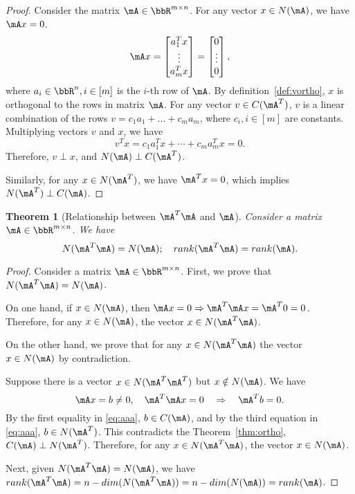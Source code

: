 \documentclass[11pt]{article}
\theoremstyle{plain}
\newtheorem{thm}{Theorem}[section]
\theoremstyle{definition}
\begin{document}
\begin{proof}
	Consider the matrix $\mA \in \bbR^{m \times n}$. For any vector $x \in N(\mA)$, we have $\mA x = 0$. 
	\begin{align}
		\mA x  = \begin{bmatrix}
			a_1^T x \\ \vdots \\ a_m^T x 
		\end{bmatrix} = \begin{bmatrix}
			0\\ \vdots \\0
		\end{bmatrix},
	\end{align}
	where $a_i \in \bbR^n, i \in [m]$ is the $i$-th  row of $\mA$. By definition~\ref{def:vortho}, $x$ is orthogonal to the rows in matrix $\mA$. For any vector $v \in C(\mA^T)$, $v$ is a linear combination of the rows $v = c_1 a_1 + ...+c_m a_m$, where $c_i, i\in [m]$ are constants. Multiplying vectors $v$ and $x$, we have
	\[  v^T x =  c_1 a_1^T x + \cdots + c_m a_m^T x = 0.  \]
	Therefore, $v \perp x$, and $N(\mA) \perp C(\mA^T)$.
	
	Similarly, for any $x \in N(\mA^T)$, we have $\mA^T x = 0$, which implies $N(\mA^T) \perp C(\mA)$. 
\end{proof}

\begin{thm}[Relationship between $\mA^T \mA$ and $\mA$]\label{thm:aa}
	Consider a matrix $\mA \in \bbR^{m \times n}$. We have
	\begin{equation}
		N(\mA^T \mA) = N(\mA) ; \quad rank(\mA^T \mA) = rank(\mA).
	\end{equation}
\end{thm}
\begin{proof}
	Consider a matrix $\mA \in \bbR^{m \times n}$. First, we prove that $N(\mA^T \mA) = N(\mA)$.
	
	On one hand, if $x \in N(\mA)$, then $\mA x = 0 \Rightarrow \mA^T  \mA x = \mA^T 0 = 0$. Therefore, for any $x \in N(\mA)$, the vector $x \in N(\mA^T \mA)$. 
	
	
	On the other hand, we  prove that for any $x \in N(\mA^T \mA)$ the vector $x \in N(\mA)$ by contradiction.
	
	Suppose there is a vector $x \in N(\mA^T \mA^T)$ but $x \notin N(\mA)$. We have
	\begin{equation}\label{eq:aaa}
		\mA x = b \neq 0, \quad \mA^T \mA x = 0 \quad \Rightarrow \quad \mA^T b = 0.
	\end{equation} 
	By the first equality in \eqref{eq:aaa}, $b \in C(\mA)$, and by the third equation in \eqref{eq:aaa}, $ b \in N(\mA^T)$. This contradicts the Theorem~\ref{thm:ortho}, $C(\mA) \perp N(\mA^T)$. Therefore, for any $x \in N(\mA^T \mA)$, the vector $x \in N(\mA)$.
	
	Next, given $N(\mA^T \mA) = N(\mA)$, we have $rank(\mA^T \mA) = n - dim(N(\mA^T \mA)) = n - dim(N(\mA)) = rank(\mA)$.
\end{proof}
\end{document}
